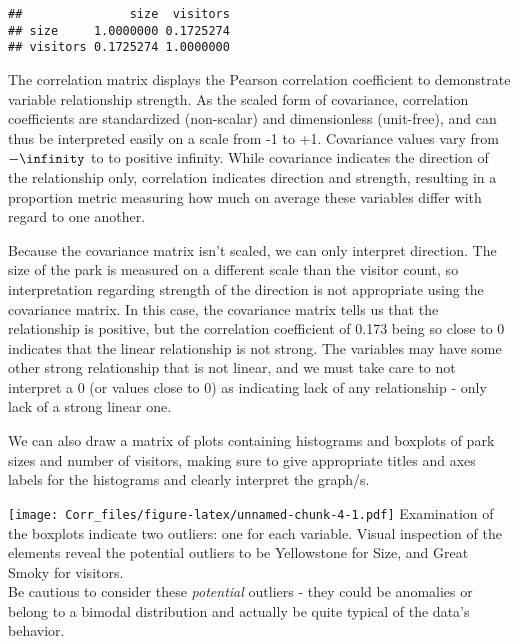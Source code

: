 \documentclass[
]{article}
\newenvironment{Shaded}{\begin{snugshade}}{\end{snugshade}}
\newcommand{\AttributeTok}[1]{\textcolor[rgb]{0.77,0.63,0.00}{#1}}
\newcommand{\CommentTok}[1]{\textcolor[rgb]{0.56,0.35,0.01}{\textit{#1}}}
\newcommand{\DecValTok}[1]{\textcolor[rgb]{0.00,0.00,0.81}{#1}}
\newcommand{\FunctionTok}[1]{\textcolor[rgb]{0.00,0.00,0.00}{#1}}
\newcommand{\NormalTok}[1]{#1}
\newcommand{\SpecialCharTok}[1]{\textcolor[rgb]{0.00,0.00,0.00}{#1}}
\newcommand{\StringTok}[1]{\textcolor[rgb]{0.31,0.60,0.02}{#1}}
\begin{document}
\begin{verbatim}
##               size  visitors
## size     1.0000000 0.1725274
## visitors 0.1725274 1.0000000
\end{verbatim}

The correlation matrix displays the Pearson correlation coefficient to
demonstrate variable relationship strength. As the scaled form of
covariance, correlation coefficients are standardized (non-scalar) and
dimensionless (unit-free), and can thus be interpreted easily on a scale
from -1 to +1. Covariance values vary from \(-\infinity\) to to positive
infinity. While covariance indicates the direction of the relationship
only, correlation indicates direction and strength, resulting in a
proportion metric measuring how much on average these variables differ
with regard to one another.

Because the covariance matrix isn't scaled, we can only interpret
direction. The size of the park is measured on a different scale than
the visitor count, so interpretation regarding strength of the direction
is not appropriate using the covariance matrix. In this case, the
covariance matrix tells us that the relationship is positive, but the
correlation coefficient of 0.173 being so close to 0 indicates that the
linear relationship is not strong. The variables may have some other
strong relationship that is not linear, and we must take care to not
interpret a 0 (or values close to 0) as indicating lack of any
relationship - only lack of a strong linear one.

We can also draw a matrix of plots containing histograms and boxplots of
park sizes and number of visitors, making sure to give appropriate
titles and axes labels for the histograms and clearly interpret the
graph/s.

\begin{Shaded}
\end{Shaded}

\texttt{[image: Corr\_files/figure-latex/unnamed-chunk-4-1.pdf]}
Examination of the boxplots indicate two outliers: one for each
variable. Visual inspection of the elements reveal the potential
outliers to be Yellowstone for Size, and Great Smoky for visitors.\\
Be cautious to consider these \emph{potential} outliers - they could be
anomalies or belong to a bimodal distribution and actually be quite
typical of the data's behavior.
\end{document}
